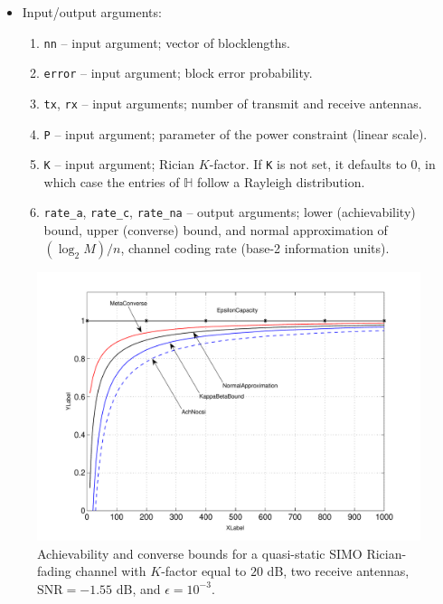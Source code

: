 \documentclass[a4paper,11p]{memoir}
\begin{document}
\begin{itemize}
\item Input/output arguments:
\begin{enumerate}
\item \verb|nn| -- input argument; vector of blocklengths.
\item \verb|error| -- input argument; block error probability.
\item \verb|tx|, \verb|rx| -- input arguments; number of transmit and receive antennas.
\item \verb|P| -- input argument; parameter of the power constraint (linear scale).
\item \verb|K| -- input argument; Rician $K$-factor. If \verb|K| is not set, it defaults to $0$, in which case the entries of $\mathbb{H}$ follow a Rayleigh distribution.
\item \verb|rate_a|, \verb|rate_c|, \verb|rate_na| -- output arguments; lower (achievability) bound, upper (converse) bound, and normal approximation of  $(\log_2 M)/n$, channel coding rate (base-2 information units).
\end{enumerate}

\end{itemize}


\begin{figure}[t]
	\centering
	\includegraphics[scale=0.8]{plots/quasi-static-simo.pdf}
\vspace{-1.5mm}
\caption{Achievability and converse bounds for a quasi-static SIMO Rician-fading channel with $K$-factor equal to $20$ dB, two receive antennas, $\text{SNR}=-1.55 $ dB, and $\epsilon=10^{-3}$. 
\label{fig:bounds-simo}}
\end{figure}
\end{document}
